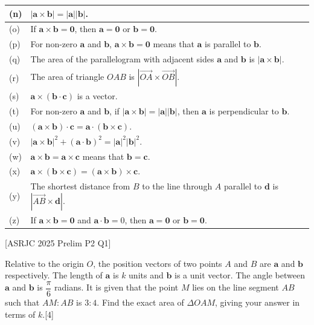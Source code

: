 \documentclass[a4paper,11pt,oneside]{book}
\providecommand{\vv}[1]{\overrightarrow{#1}}\providecommand{\cvv}[3]{\begin{pmatrix}#1\\#2\\#3\end{pmatrix}}
\newcounter{wq}
\newcommand{\Q}[1]{\par\needspace{5\baselineskip}\medskip\stepcounter{wq}\noindent\textbf{\thewq}\quad #1\par}
\begin{document}
{\begin{longtable}{|>{\centering\arraybackslash}p{0.9cm}|p{\dimexpr\linewidth-0.9cm-1.6cm-6\tabcolsep-4\arrayrulewidth\relax}|>{\centering\arraybackslash}p{1.6cm}|}
(n)&$|\mathbf a\times\mathbf b|=|\mathbf a||\mathbf b|$.\rule[-8pt]{0pt}{8pt}&\\\hline
(o)&If $\mathbf a\times\mathbf b=\mathbf 0$, then $\mathbf a=\mathbf 0$ or $\mathbf b=\mathbf 0$.\rule[-8pt]{0pt}{8pt}&\\\hline
(p)&For non-zero $\mathbf a$ and $\mathbf b$, $\mathbf a\times\mathbf b=\mathbf 0$ means that $\mathbf a$ is parallel to $\mathbf b$.\rule[-8pt]{0pt}{8pt}&\\\hline
(q)&The area of the parallelogram with adjacent sides $\mathbf a$ and $\mathbf b$ is $|\mathbf a\times\mathbf b|$.\rule[-8pt]{0pt}{8pt}&\\\hline
(r)&The area of triangle $OAB$ is $|\vv{OA}\times\vv{OB}|$.\rule[-8pt]{0pt}{8pt}&\\\hline
(s)&$\mathbf a\times(\mathbf b\cdot\mathbf c)$ is a vector.\rule[-8pt]{0pt}{8pt}&\\\hline
(t)&For non-zero $\mathbf a$ and $\mathbf b$, if $|\mathbf a\times\mathbf b|=|\mathbf a||\mathbf b|$, then $\mathbf a$ is perpendicular to $\mathbf b$.\rule[-8pt]{0pt}{8pt}&\\\hline
(u)&$(\mathbf a\times\mathbf b)\cdot\mathbf c=\mathbf a\cdot(\mathbf b\times\mathbf c)$.\rule[-8pt]{0pt}{8pt}&\\\hline
(v)&$|\mathbf a\times\mathbf b|^2+(\mathbf a\cdot\mathbf b)^2=|\mathbf a|^2|\mathbf b|^2$.\rule[-8pt]{0pt}{8pt}&\\\hline
(w)&$\mathbf a\times\mathbf b=\mathbf a\times\mathbf c$ means that $\mathbf b=\mathbf c$.\rule[-8pt]{0pt}{8pt}&\\\hline
(x)&$\mathbf a\times(\mathbf b\times\mathbf c)=(\mathbf a\times\mathbf b)\times\mathbf c$.\rule[-8pt]{0pt}{8pt}&\\\hline
(y)&The shortest distance from $B$ to the line through $A$ parallel to $\mathbf d$ is $|\vv{AB}\times\mathbf d|$.\rule[-8pt]{0pt}{8pt}&\\\hline
(z)&If $\mathbf a\times\mathbf b=\mathbf 0$ and $\mathbf a\cdot\mathbf b=0$, then $\mathbf a=\mathbf 0$ or $\mathbf b=\mathbf 0$.\rule[-8pt]{0pt}{8pt}&\\\hline\end{longtable}}
\Q{\textcolor{black!60}{\small[ASRJC 2025 Prelim P2 Q1]}\par\smallskip
Relative to the origin $O$, the position vectors of two points $A$ and $B$ are $\mathbf a$ and $\mathbf b$ respectively. The length of $\mathbf a$ is $k$ units and $\mathbf b$ is a unit vector. The angle between $\mathbf a$ and $\mathbf b$ is $\dfrac{\pi}{6}$ radians.
It is given that the point $M$ lies on the line segment $AB$ such that $AM:AB$ is $3:4$. Find the exact area of $\Delta OAM$, giving your answer in terms of $k$.\hfill[4]
}
\end{document}
